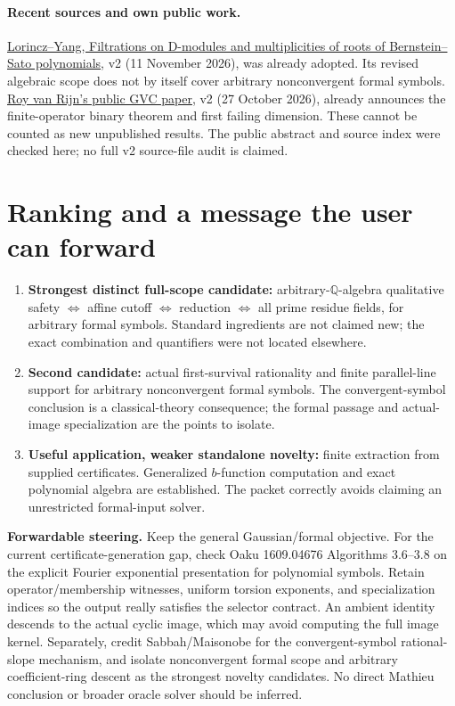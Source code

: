 \documentclass[11pt]{article}
\begin{document}
\paragraph{Recent sources and own public work.}
\href{https://arxiv.org/abs/2609.05215}{Lorincz--Yang, Filtrations on D-modules and multiplicities of roots of Bernstein--Sato polynomials}, v2 (11 November 2026), was already adopted. Its revised algebraic scope does not by itself cover arbitrary nonconvergent formal symbols. \href{https://hexagonmath.org/2610.00580v2}{Roy van Rijn's public GVC paper}, v2 (27 October 2026), already announces the finite-operator binary theorem and first failing dimension. These cannot be counted as new unpublished results. The public abstract and source index were checked here; no full v2 source-file audit is claimed.

\section*{Ranking and a message the user can forward}
\begin{enumerate}
\item \textbf{Strongest distinct full-scope candidate:} arbitrary-$\mathbb Q$-algebra qualitative safety $\Leftrightarrow$ affine cutoff $\Leftrightarrow$ reduction $\Leftrightarrow$ all prime residue fields, for arbitrary formal symbols. Standard ingredients are not claimed new; the exact combination and quantifiers were not located elsewhere.
\item \textbf{Second candidate:} actual first-survival rationality and finite parallel-line support for arbitrary nonconvergent formal symbols. The convergent-symbol conclusion is a classical-theory consequence; the formal passage and actual-image specialization are the points to isolate.
\item \textbf{Useful application, weaker standalone novelty:} finite extraction from supplied certificates. Generalized $b$-function computation and exact polynomial algebra are established. The packet correctly avoids claiming an unrestricted formal-input solver.
\end{enumerate}

\noindent\textbf{Forwardable steering.} Keep the general Gaussian/formal objective. For the current certificate-generation gap, check Oaku 1609.04676 Algorithms 3.6--3.8 on the explicit Fourier exponential presentation for polynomial symbols. Retain operator/membership witnesses, uniform torsion exponents, and specialization indices so the output really satisfies the selector contract. An ambient identity descends to the actual cyclic image, which may avoid computing the full image kernel. Separately, credit Sabbah/Maisonobe for the convergent-symbol rational-slope mechanism, and isolate nonconvergent formal scope and arbitrary coefficient-ring descent as the strongest novelty candidates. No direct Mathieu conclusion or broader oracle solver should be inferred.
\end{document}
